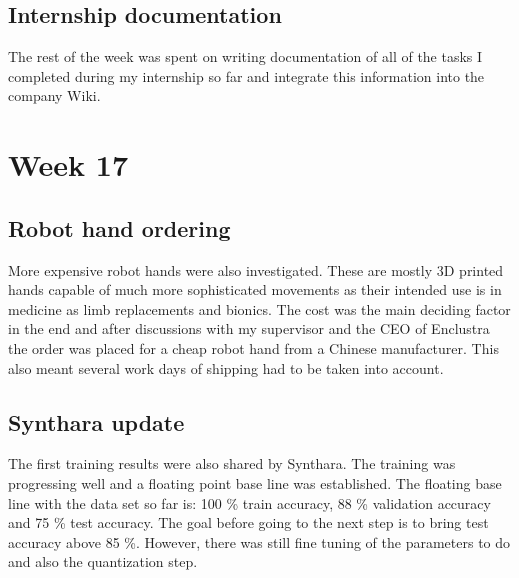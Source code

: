 \subsection{Internship documentation}
The rest of the week was spent on writing documentation of all of the tasks I completed during my internship so far and integrate this information into the company Wiki.

\section{Week 17}
\subsection{Robot hand ordering}
More expensive robot hands were also investigated. These are mostly 3D printed hands capable of much more sophisticated movements as their intended use is in medicine as limb replacements and bionics. The cost was the main deciding factor in the end and after discussions with my supervisor and the CEO of Enclustra the order was placed for a cheap robot hand from a Chinese manufacturer. This also meant several work days of shipping had to be taken into account.
\subsection{Synthara update}
The first training results were also shared by Synthara. The training was progressing well and a floating point base line was established. The floating base line with the data set so far is: 100 \% train accuracy, 88 \% validation accuracy and 75 \% test accuracy. The goal before going to the next step is to bring test accuracy above 85 \%.  However, there was still fine tuning of the parameters to do and also the quantization step.

